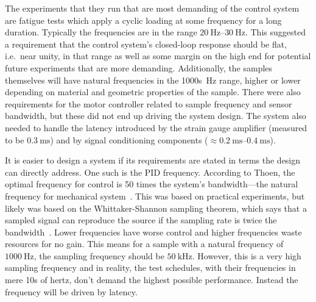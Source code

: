 \documentclass[english,12pt,a4paper,pdftex,eng,utf8]{aaltothesis}
\newcommand\ie{i.e.\ }
\begin{document}
The experiments that they run that are most demanding of the control system are fatigue tests which apply a cyclic loading at some frequency for a long duration.  Typically the frequencies are in the range $\qtyrange[range-units=single,range-phrase=..]{20}{30}{\hertz}$.  This suggested a requirement that the control system's closed-loop response should be flat, \ie near unity, in that range as well as some margin on the high end for potential future experiments that are more demanding.  Additionally, the samples themselves will have natural frequencies in the 1000s~Hz range, higher or lower depending on material and geometric properties of the sample.  There were also requirements for the motor controller related to sample frequency and sensor bandwidth, but these did not end up driving the system design.  The system also needed to handle the latency introduced by the strain gauge amplifier (measured to be $\qty{0.3}{\milli\second}$) and by signal conditioning components ($\approx\qtyrange[range-units=single,range-phrase=..]{0.2}{0.4}{\milli\second}$).

It is easier to design a system if its requirements are stated in terms the design can directly address.  One such is the PID frequency.  According to Thoen, the optimal frequency for control is 50 times the system's bandwidth---the natural frequency for mechanical system~\cite{Thoen2021}.  This was based on practical experiments, but likely was based on the Whittaker-Shannon sampling theorem, which says that a sampled signal can reproduce the source if the sampling rate is twice the bandwidth~\cite{Whittaker1915,Shannon1949}.  Lower frequencies have worse control and higher frequencies waste resources for no gain.  This means for a sample with a natural frequency of $\qty{1000}{\hertz}$, the sampling frequency should be $\qty{50}{\kilo\hertz}$.  However, this is a very high sampling frequency and in reality, the test schedules, with their frequencies in mere 10s of hertz, don't demand the highest possible performance.  Instead the frequency will be driven by latency.
\end{document}
